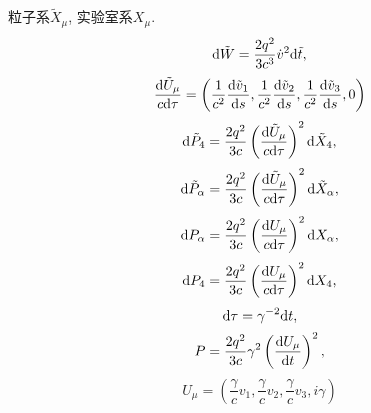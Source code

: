 粒子系$\tilde{X}_\mu$, 实验室系${X}_\mu$.
\begin{equation}
    \mathrm{d} \tilde{W}=\frac{2q^2}{3c^3}\dot{v}^2\mathrm{d} \tilde{t},
\end{equation}
\begin{equation}
    \frac{\mathrm{d} \tilde{U}_\mu}{c\mathrm{d} \tau}=\left(
        \frac{1}{c^2}\frac{\mathrm{d} \tilde{v}_1}{\mathrm{d} s},
        \frac{1}{c^2}\frac{\mathrm{d} \tilde{v}_2}{\mathrm{d} s},
        \frac{1}{c^2}\frac{\mathrm{d} \tilde{v}_3}{\mathrm{d} s},
        0
    \right)
\end{equation}
\begin{equation}
    \mathrm{d} \tilde{P}_4=\frac{2q^2}{3c}\left(\frac{\mathrm{d} \tilde{U}_\mu}{c\mathrm{d} \tau}\right)^2\mathrm{d} \tilde{X}_4,
\end{equation}
\begin{equation}
    \mathrm{d} \tilde{P}_\alpha=\frac{2q^2}{3c}\left(\frac{\mathrm{d} \tilde{U}_\mu}{c\mathrm{d} \tau}\right)^2\mathrm{d} \tilde{X}_\alpha,
\end{equation}
\begin{equation}
    \mathrm{d} {P}_\alpha=\frac{2q^2}{3c}\left(\frac{\mathrm{d} {U}_\mu}{c\mathrm{d} \tau}\right)^2\mathrm{d} {X}_\alpha,
\end{equation}
\begin{equation}
    \mathrm{d} {P}_4=\frac{2q^2}{3c}\left(\frac{\mathrm{d} {U}_\mu}{c\mathrm{d} \tau}\right)^2\mathrm{d} {X}_4,
\end{equation}
\begin{equation}
    \mathrm{d} \tau=\gamma^{-2}\mathrm{d} t,
\end{equation}
\begin{equation}
    P=\frac{2q^2}{3c}\gamma^2\left(\frac{\mathrm{d} {U}_\mu}{\mathrm{d} t}\right)^2,
\end{equation}
\begin{equation}
    {U}_\mu=\left(
        \frac{\gamma}{c}v_1,
        \frac{\gamma}{c}v_2,
        \frac{\gamma}{c}v_3,
        i\gamma
    \right)
\end{equation}
